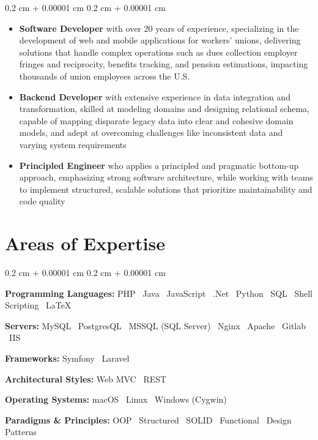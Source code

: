 \documentclass[10pt, letterpaper]{article}
\newenvironment{highlightsforbulletentries}{
    \begin{itemize}[
        topsep=0.10 cm,
        parsep=0.10 cm,
        partopsep=0pt,
        itemsep=0pt,
        leftmargin=10pt
    ]
}{
    \end{itemize}
} %
\newenvironment{onecolentry}{
    \begin{adjustwidth}{
        0.2 cm + 0.00001 cm
    }{
        0.2 cm + 0.00001 cm
    }
}{
    \end{adjustwidth}
} %
\begin{document}
    \begin{onecolentry}
        \begin{highlightsforbulletentries}

        \item \textbf{Software Developer} with over 20 years of experience, specializing in the development of web and mobile applications for workers' unions, delivering solutions that handle complex operations such as dues collection employer fringes and reciprocity, benefits tracking, and pension estimations, impacting thousands of union employees across the U.S.

        \item \textbf{Backend Developer} with extensive experience in data integration and transformation, skilled at modeling domains and designing relational schema, capable of mapping disparate legacy data into clear and cohesive domain models, and adept at overcoming challenges like inconsistent data and varying system requirements

        \item \textbf{Principled Engineer} who applies a principled and pragmatic bottom-up approach, emphasizing strong software architecture, while working with teams to implement structured, scalable solutions that prioritize maintainability and code quality

        \end{highlightsforbulletentries}
    \end{onecolentry}

    \section{Areas of Expertise}

        \begin{onecolentry}
            \textbf{Programming Languages:} PHP \textbar\ Java \textbar\ JavaScript \textbar\ .Net \textbar\ Python \textbar\ SQL \textbar\ Shell Scripting \textbar\ \LaTeX

            \textbf{Servers:} MySQL \textbar\ PostgresQL \textbar\ MSSQL (SQL Server) \textbar\ Nginx \textbar\ Apache \textbar\ Gitlab \textbar\ IIS

            \textbf{Frameworks:} Symfony \textbar\ Laravel

            \textbf{Architectural Styles:} Web MVC \textbar\ REST

            \textbf{Operating Systems:} macOS \textbar\ Linux \textbar\ Windows (Cygwin)

            \textbf{Paradigms \& Principles:} OOP \textbar\ Structured \textbar\ SOLID \textbar\ Functional \textbar\ Design Patterns
        \end{onecolentry}
            
\end{document}
